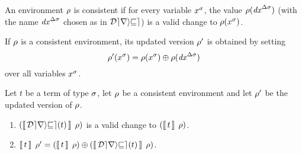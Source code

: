 \begin{definition}
\label{def:consistent-env}
An environment $\rho$ is consistent if for every variable $x^\sigma$,
the value $\rho(\mathit{dx}^{\Delta\sigma})$ (with the name $\mathit{dx}^{\Delta\sigma}$
chosen as in $\mathcal{Derive}$) is a valid change to $\rho(x^\sigma)$.
\end{definition}

\begin{definition}
\label{def:updated-env}
If $\rho$ is a consistent environment, its updated version $\rho'$
is obtained by setting
\[
\Gr'(x^\Gs) = \Apply{\Gr(\D x^{\GD\Gs})}{\Gr(x^\Gs)}
\]
over all variables $x^\sigma$.
\end{definition}

\begin{lemma}
\label{lem:STLC-valid-correct}
Let $t$ be a term of type $\sigma$, let $\rho$ be a consistent
environment and let $\rho'$ be the updated version of $\rho$.
\begin{enumerate}[(1)]
\item
$\mean*[\Gr]{\Derive t}$ is a valid change to $\mean*[\Gr]t$.
\item
$
\mean[\Gr']t = \Apply{\mean*[\Gr]{\Derive t}}{\mean*[\Gr]t}
$.
\end{enumerate}
\end{lemma}


